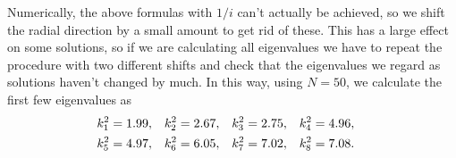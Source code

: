 \documentclass[10pt,a4paper,twocolumn]{article}
\begin{document}
Numerically, the above formulas with $1/i$ can't actually be achieved, so we shift the radial direction by a small amount to get rid of these. This has a large effect on some solutions, so if we are calculating all eigenvalues we have to repeat the procedure with two different shifts and check that the eigenvalues we regard as solutions haven't changed by much. In this way, using $N=50$, we calculate the first few eigenvalues as
%
\begin{align}
    &k_1^2 = 1.99,& &k_2^2 = 2.67,& &k_3^2 = 2.75,& &k_4^2 = 4.96,&\notag\\
    &k_5^2 = 4.97,& &k_6^2 = 6.05,& &k_7^2 = 7.02,& &k_8^2 = 7.08.&
\end{align}

\nocite{BCs}

\printbibliography
\end{document}
